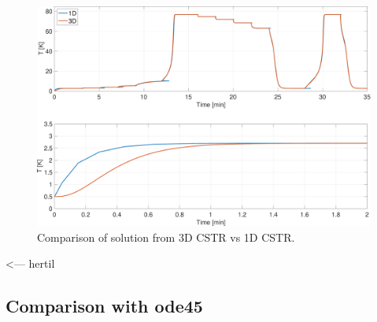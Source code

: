\begin{figure}[h]
    \centering
    \includegraphics[width=\textwidth]{plots/6_5_both.pdf}
    \caption{Comparison of solution from 3D CSTR vs 1D CSTR.}
    \label{fig:6_5_both}
\end{figure}

<--- hertil

\subsection{Comparison with ode45}





























